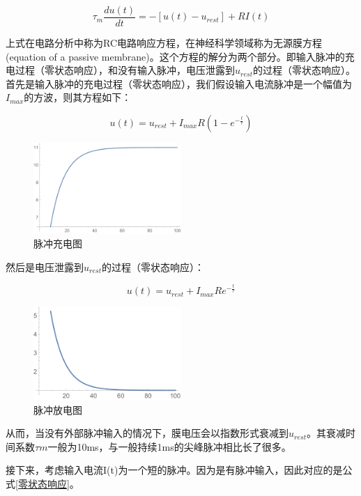 \documentclass[12pt, a4paper, oneside]{ctexbook}
\begin{document}
\begin{equation}
    \tau _m\frac{du(t)}{dt}= -[u(t)-u_{rest}] + RI(t)
\end{equation}

上式在电路分析中称为RC电路响应方程，在神经科学领域称为无源膜方程(equation of a passive membrane)。这个方程的解分为两个部分。即输入脉冲的充电过程（零状态响应），和没有输入脉冲，电压泄露到$u_{rest}$的过程（零状态响应）。首先是输入脉冲的充电过程（零状态响应），我们假设输入电流脉冲是一个幅值为$I_{max}$的方波，则其方程如下：

\begin{equation}
    u(t)=u_{rest}+I_{max}R(1-e^{-\frac{t}{\tau}})
    \label{零状态响应}
\end{equation}

\begin{figure}[H]
    \centering
    \includegraphics[width=0.5\textwidth]{脉冲充电图.pdf}
    \caption{脉冲充电图}
\end{figure} 

然后是电压泄露到$u_{rest}$的过程（零状态响应）：

\begin{equation}
    u(t)=u_{rest}+I_{max}Re^{-\frac{t}{\tau}}
    \label{零输入响应}
\end{equation}

\begin{figure}[H]
    \centering
    \includegraphics[width=0.5\textwidth]{脉冲放电图.pdf}
    \caption{脉冲放电图}
\end{figure} 

从而，当没有外部脉冲输入的情况下，膜电压会以指数形式衰减到$u_{rest}$。其衰减时间系数$\tau m$一般为10ms，与一般持续1ms的尖峰脉冲相比长了很多。

接下来，考虑输入电流I(t)为一个短的脉冲。因为是有脉冲输入，因此对应的是公式\ref*{零状态响应}。
\end{document}
